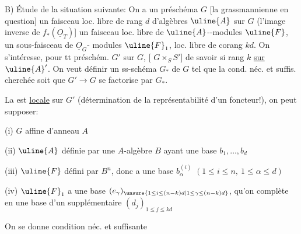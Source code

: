 B) Étude de la situation suivante: On a un préschéma $G$ [la grassmannienne en question] un faisceau loc. libre de rang $d$ d'algèbres $\uline{A}$ sur $G$ (l'image inverse de $f_*(\underline{O}_T)$] un faisceau loc. libre de $\uline{A}$--modules $\uline{F}$, un sous-faisceau de $\underline{O}_G$- modules $\uline{F}_1$,  loc. libre de corang $kd$.
On s'intéresse, pour tt préschém. $G'$ sur $G$, [ $G\times_S S'$] de savoir si    rang $k$ \uline{sur $\uline{A}'$}. On veut définir un ss-schéma  $G_*$ de $G$ tel que la cond. néc. et suffis. cherchée soit que $G'\longrightarrow G$ se factorise par $G_*$.

La   est \uline{locale} sur $G'$ (détermination de la représentabilité d'un foncteur!), on peut supposer: 

(i) $G$ affine d'anneau $A$

(ii) $\uline{A}$ définie par une $A$-algèbre $B$ ayant une base $b_1,\ldots,b_d$

(iii) $\uline{F}$ défini par $B^n$, donc a une base $b_\alpha^{(i)}$ $(1\leq i\leq n,\ 1\leq\alpha\leq d)$

(iv) $\uline{F}_1$ a une base  $(e_\gamma)_{\unsure{1\leq i\leq(n-k)d|1\leq\gamma\leq(n-k)d}}$, qu'on complète en une base d'un supplémentaire $(d_j)_{1\leq j\leq kd}$

On se donne   condition néc. et suffisante

